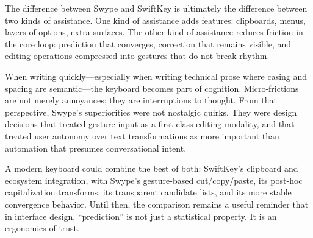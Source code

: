 \documentclass[11pt]{article}
\begin{document}
The difference between Swype and SwiftKey is ultimately the difference between two kinds of assistance. One kind of assistance adds features: clipboards, menus, layers of options, extra surfaces. The other kind of assistance reduces friction in the core loop: prediction that converges, correction that remains visible, and editing operations compressed into gestures that do not break rhythm.

When writing quickly---especially when writing technical prose where casing and spacing are semantic---the keyboard becomes part of cognition. Micro-frictions are not merely annoyances; they are interruptions to thought. From that perspective, Swype's superiorities were not nostalgic quirks. They were design decisions that treated gesture input as a first-class editing modality, and that treated user autonomy over text transformations as more important than automation that presumes conversational intent.

A modern keyboard could combine the best of both: SwiftKey's clipboard and ecosystem integration, with Swype's gesture-based cut/copy/paste, its post-hoc capitalization transforms, its transparent candidate lists, and its more stable convergence behavior. Until then, the comparison remains a useful reminder that in interface design, ``prediction'' is not just a statistical property. It is an ergonomics of trust.
\end{document}
